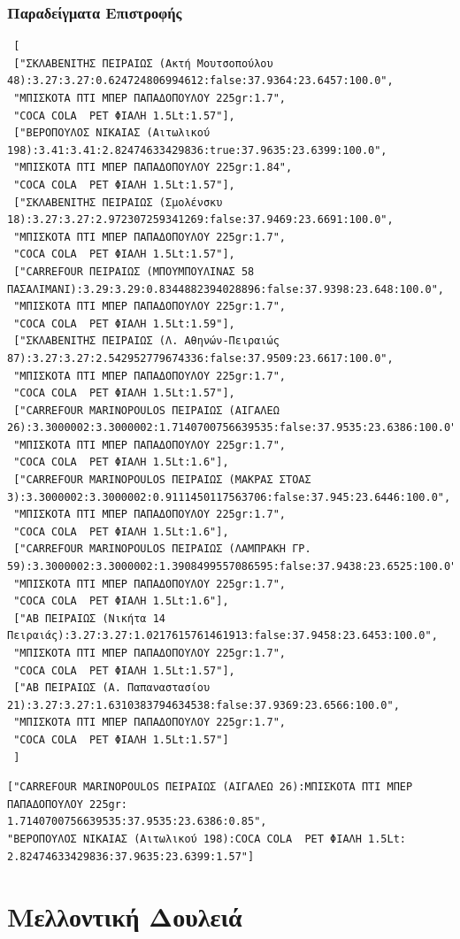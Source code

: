 \documentclass[a4paper,10pt]{report}
\begin{document}
\subsubsection{Παραδείγματα Επιστροφής}
\begin{verbatim}
 [
 ["ΣΚΛΑΒΕΝΙΤΗΣ ΠΕΙΡΑΙΩΣ (Ακτή Μουτσοπούλου 48):3.27:3.27:0.624724806994612:false:37.9364:23.6457:100.0",
 "ΜΠΙΣΚΟΤΑ ΠΤΙ ΜΠΕΡ ΠΑΠΑΔΟΠΟΥΛΟΥ 225gr:1.7",
 "COCA COLA  PET ΦΙΑΛΗ 1.5Lt:1.57"],
 ["ΒΕΡΟΠΟΥΛΟΣ ΝΙΚΑΙΑΣ (Αιτωλικού 198):3.41:3.41:2.82474633429836:true:37.9635:23.6399:100.0",
 "ΜΠΙΣΚΟΤΑ ΠΤΙ ΜΠΕΡ ΠΑΠΑΔΟΠΟΥΛΟΥ 225gr:1.84",
 "COCA COLA  PET ΦΙΑΛΗ 1.5Lt:1.57"],
 ["ΣΚΛΑΒΕΝΙΤΗΣ ΠΕΙΡΑΙΩΣ (Σμολένσκυ 18):3.27:3.27:2.972307259341269:false:37.9469:23.6691:100.0",
 "ΜΠΙΣΚΟΤΑ ΠΤΙ ΜΠΕΡ ΠΑΠΑΔΟΠΟΥΛΟΥ 225gr:1.7",
 "COCA COLA  PET ΦΙΑΛΗ 1.5Lt:1.57"],
 ["CARREFOUR ΠΕΙΡΑΙΩΣ (ΜΠΟΥΜΠΟΥΛΙΝΑΣ 58 ΠΑΣΑΛΙΜΑΝΙ):3.29:3.29:0.8344882394028896:false:37.9398:23.648:100.0",
 "ΜΠΙΣΚΟΤΑ ΠΤΙ ΜΠΕΡ ΠΑΠΑΔΟΠΟΥΛΟΥ 225gr:1.7",
 "COCA COLA  PET ΦΙΑΛΗ 1.5Lt:1.59"],
 ["ΣΚΛΑΒΕΝΙΤΗΣ ΠΕΙΡΑΙΩΣ (Λ. Αθηνών-Πειραιώς 87):3.27:3.27:2.542952779674336:false:37.9509:23.6617:100.0",
 "ΜΠΙΣΚΟΤΑ ΠΤΙ ΜΠΕΡ ΠΑΠΑΔΟΠΟΥΛΟΥ 225gr:1.7",
 "COCA COLA  PET ΦΙΑΛΗ 1.5Lt:1.57"],
 ["CARREFOUR MARINOPOULOS ΠΕΙΡΑΙΩΣ (ΑΙΓΑΛΕΩ 26):3.3000002:3.3000002:1.7140700756639535:false:37.9535:23.6386:100.0",
 "ΜΠΙΣΚΟΤΑ ΠΤΙ ΜΠΕΡ ΠΑΠΑΔΟΠΟΥΛΟΥ 225gr:1.7",
 "COCA COLA  PET ΦΙΑΛΗ 1.5Lt:1.6"],
 ["CARREFOUR MARINOPOULOS ΠΕΙΡΑΙΩΣ (ΜΑΚΡΑΣ ΣΤΟΑΣ 3):3.3000002:3.3000002:0.9111450117563706:false:37.945:23.6446:100.0",
 "ΜΠΙΣΚΟΤΑ ΠΤΙ ΜΠΕΡ ΠΑΠΑΔΟΠΟΥΛΟΥ 225gr:1.7",
 "COCA COLA  PET ΦΙΑΛΗ 1.5Lt:1.6"],
 ["CARREFOUR MARINOPOULOS ΠΕΙΡΑΙΩΣ (ΛΑΜΠΡΑΚΗ ΓΡ. 59):3.3000002:3.3000002:1.3908499557086595:false:37.9438:23.6525:100.0",
 "ΜΠΙΣΚΟΤΑ ΠΤΙ ΜΠΕΡ ΠΑΠΑΔΟΠΟΥΛΟΥ 225gr:1.7",
 "COCA COLA  PET ΦΙΑΛΗ 1.5Lt:1.6"],
 ["ΑΒ ΠΕΙΡΑΙΩΣ (Νικήτα 14 Πειραιάς):3.27:3.27:1.0217615761461913:false:37.9458:23.6453:100.0",
 "ΜΠΙΣΚΟΤΑ ΠΤΙ ΜΠΕΡ ΠΑΠΑΔΟΠΟΥΛΟΥ 225gr:1.7",
 "COCA COLA  PET ΦΙΑΛΗ 1.5Lt:1.57"],
 ["ΑΒ ΠΕΙΡΑΙΩΣ (Α. Παπαναστασίου 21):3.27:3.27:1.6310383794634538:false:37.9369:23.6566:100.0",
 "ΜΠΙΣΚΟΤΑ ΠΤΙ ΜΠΕΡ ΠΑΠΑΔΟΠΟΥΛΟΥ 225gr:1.7",
 "COCA COLA  PET ΦΙΑΛΗ 1.5Lt:1.57"]
 ]
\end{verbatim}
\begin{verbatim}
["CARREFOUR MARINOPOULOS ΠΕΙΡΑΙΩΣ (ΑΙΓΑΛΕΩ 26):ΜΠΙΣΚΟΤΑ ΠΤΙ ΜΠΕΡ ΠΑΠΑΔΟΠΟΥΛΟΥ 225gr:
1.7140700756639535:37.9535:23.6386:0.85",
"ΒΕΡΟΠΟΥΛΟΣ ΝΙΚΑΙΑΣ (Αιτωλικού 198):COCA COLA  PET ΦΙΑΛΗ 1.5Lt:
2.82474633429836:37.9635:23.6399:1.57"]
\end{verbatim}

\section{Μελλοντική Δουλειά}
\end{document}
